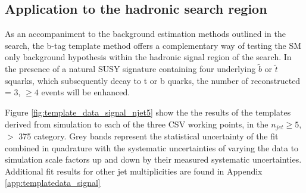  
\subsection{Application to the \alphat hadronic search region}
\label{subsec:templatedataresults}

As an accompaniment to the background estimation methods outlined in the \alphat search, the b-tag template method offers a complementary way of testing the \ac{SM} only background hypothesis within the hadronic signal region of the search. In the presence of a natural \ac{SUSY} signature containing four underlying $\widetilde{b}$ or $\widetilde{t}$ squarks, which subsequently decay to t or b quarks, the number of reconstructed \nbreco = 3, $\geq 4$ events will be enhanced.

Figure \ref{fig:template_data_signal_njet5} show the  the results of the templates derived from simulation to each of the three \ac{CSV} working points, in the $n_{jet} \geq 5$, \theht $>$ 375 \GeV category.  Grey bands represent the statistical uncertainty of the fit combined in quadrature with the systematic uncertainties of varying the data to simulation scale factors up and down by their measured systematic uncertainties.  Additional fit results for other jet multiplicities are found in Appendix \ref{app:templatedata_signal}  

